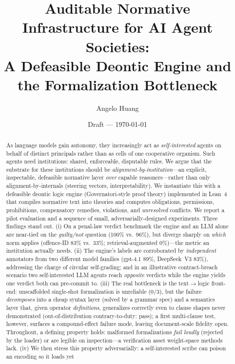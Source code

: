 \documentclass[11pt]{article}
\title{Auditable Normative Infrastructure for AI Agent Societies:\\
A Defeasible Deontic Engine and the Formalization Bottleneck}
\author{Angelo Huang}
\date{Draft --- \today}
\begin{document}
\maketitle

\begin{abstract}
As language models gain autonomy, they increasingly act as \emph{self-interested}
agents on behalf of distinct principals rather than as cells of one cooperative
organism. Such agents need institutions: shared, enforceable, disputable rules.
We argue that the substrate for these institutions should be \emph{alignment-by-institution}---an
explicit, inspectable, defeasible normative layer \emph{over} capable reasoners---rather
than only alignment-by-internals (steering vectors, interpretability). We
instantiate this with a defeasible deontic logic engine (Governatori-style proof
theory) implemented in Lean~4 that compiles normative text into theories and
computes obligations, permissions, prohibitions, compensatory remedies, violations,
and \emph{unresolved} conflicts. We report a pilot evaluation and a sequence of
small, adversarially-designed experiments. Three findings stand out. (i) On a
penal-law verdict benchmark the engine and an LLM alone are near-tied on the
\emph{guilty/not} question (100\% vs.\ 96\%), but diverge sharply on \emph{which}
norm applies (offence-ID 83\% vs.\ 33\%; retrieval-augmented 0\%)---the metric an
institution actually needs. (ii) The engine's labels are corroborated by
\emph{independent} annotators from two different model families (gpt-4.1 89\%,
DeepSeek~V3 83\%), addressing the charge of circular self-grading; and in an
illustrative contract-breach scenario two self-interested LLM
agents reach \emph{opposite} verdicts while the engine yields one verdict both can
pre-commit to. (iii) The real bottleneck is the text$\rightarrow$logic
front-end: unscaffolded single-shot formalization is unreliable (0/3), but the
failure \emph{decomposes} into a cheap syntax layer (solved by a grammar spec)
and a semantics layer that, given operator \emph{definitions}, generalizes
correctly even to clause shapes never demonstrated (out-of-distribution
contrary-to-duty: pass); a first multi-clause test, however, surfaces a
compound-effect failure mode, leaving document-scale fidelity open. Throughout, a defining property holds: malformed
formalizations \emph{fail loudly} (rejected by the loader) or are legible on
inspection---a verification asset weight-space methods lack. (iv) We then stress this
property adversarially: a self-interested scribe can poison an encoding so it loads yet

\end{abstract}
\end{document}

